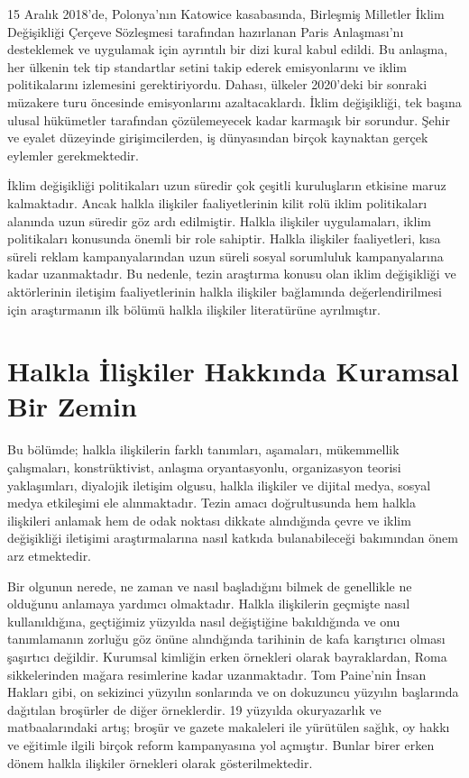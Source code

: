 \documentclass[
]{book}
\begin{document}
15 Aralık 2018'de, Polonya'nın Katowice kasabasında, Birleşmiş Milletler İklim Değişikliği Çerçeve Sözleşmesi tarafından hazırlanan Paris Anlaşması'nı desteklemek ve uygulamak için ayrıntılı bir dizi kural kabul edildi. Bu anlaşma, her ülkenin tek tip standartlar setini takip ederek emisyonlarını ve iklim politikalarını izlemesini gerektiriyordu. Dahası, ülkeler 2020'deki bir sonraki müzakere turu öncesinde emisyonlarını azaltacaklardı. İklim değişikliği, tek başına ulusal hükümetler tarafından çözülemeyecek kadar karmaşık bir sorundur. Şehir ve eyalet düzeyinde girişimcilerden, iş dünyasından birçok kaynaktan gerçek eylemler gerekmektedir. \citep{dhanda2019climate}

İklim değişikliği politikaları uzun süredir çok çeşitli kuruluşların etkisine maruz kalmaktadır. Ancak halkla ilişkiler faaliyetlerinin kilit rolü iklim politikaları alanında uzun süredir göz ardı edilmiştir. Halkla ilişkiler uygulamaları, iklim politikaları konusunda önemli bir role sahiptir. Halkla ilişkiler faaliyetleri, kısa süreli reklam kampanyalarından uzun süreli sosyal sorumluluk kampanyalarına kadar uzanmaktadır.\citep{brulle2021role} Bu nedenle, tezin araştırma konusu olan iklim değişikliği ve aktörlerinin iletişim faaliyetlerinin halkla ilişkiler bağlamında değerlendirilmesi için araştırmanın ilk bölümü halkla ilişkiler literatürüne ayrılmıştır.

\hypertarget{halkla-iliux15fkiler-hakkux131nda-kuramsal-bir-zemin}{%
\section{Halkla İlişkiler Hakkında Kuramsal Bir Zemin}\label{halkla-iliux15fkiler-hakkux131nda-kuramsal-bir-zemin}}

Bu bölümde; halkla ilişkilerin farklı tanımları, aşamaları, mükemmellik çalışmaları, konstrüktivist, anlaşma oryantasyonlu, organizasyon teorisi yaklaşımları, diyalojik iletişim olgusu, halkla ilişkiler ve dijital medya, sosyal medya etkileşimi ele alınmaktadır. Tezin amacı doğrultusunda hem halkla ilişkileri anlamak hem de odak noktası dikkate alındığında çevre ve iklim değişikliği iletişimi araştırmalarına nasıl katkıda bulanabileceği bakımından önem arz etmektedir.

Bir olgunun nerede, ne zaman ve nasıl başladığını bilmek de genellikle ne olduğunu anlamaya yardımcı olmaktadır. Halkla ilişkilerin geçmişte nasıl kullanıldığına, geçtiğimiz yüzyılda nasıl değiştiğine bakıldığında ve onu tanımlamanın zorluğu göz önüne alındığında tarihinin de kafa karıştırıcı olması şaşırtıcı değildir. Kurumsal kimliğin erken örnekleri olarak bayraklardan, Roma sikkelerinden mağara resimlerine kadar uzanmaktadır. Tom Paine'nin İnsan Hakları gibi, on sekizinci yüzyılın sonlarında ve on dokuzuncu yüzyılın başlarında dağıtılan broşürler de diğer örneklerdir. 19 yüzyılda okuryazarlık ve matbaalarındaki artış; broşür ve gazete makaleleri ile yürütülen sağlık, oy hakkı ve eğitimle ilgili birçok reform kampanyasına yol açmıştır. Bunlar birer erken dönem halkla ilişkiler örnekleri olarak gösterilmektedir. \citep{theaker2016public}
\end{document}
